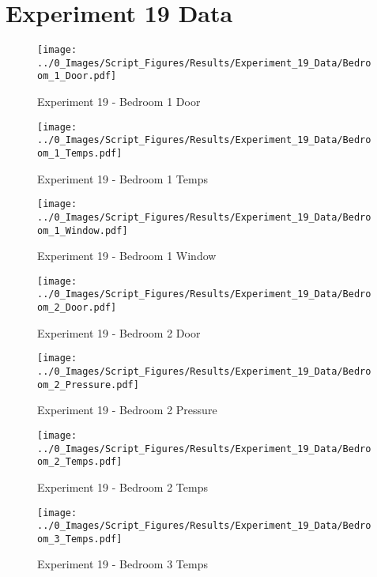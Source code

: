 \clearpage		\large
\section{Experiment 19 Data} \label{App:Exp19Results} 

	\begin{figure}[H]
		\centering
		\texttt{[image: ../0\_Images/Script\_Figures/Results/Experiment\_19\_Data/Bedroom\_1\_Door.pdf]}
		\caption[]{Experiment 19 - Bedroom 1 Door}
	\end{figure}
 

	\begin{figure}[H]
		\centering
		\texttt{[image: ../0\_Images/Script\_Figures/Results/Experiment\_19\_Data/Bedroom\_1\_Temps.pdf]}
		\caption[]{Experiment 19 - Bedroom 1 Temps}
	\end{figure}
 
	\clearpage

	\begin{figure}[H]
		\centering
		\texttt{[image: ../0\_Images/Script\_Figures/Results/Experiment\_19\_Data/Bedroom\_1\_Window.pdf]}
		\caption[]{Experiment 19 - Bedroom 1 Window}
	\end{figure}
 

	\begin{figure}[H]
		\centering
		\texttt{[image: ../0\_Images/Script\_Figures/Results/Experiment\_19\_Data/Bedroom\_2\_Door.pdf]}
		\caption[]{Experiment 19 - Bedroom 2 Door}
	\end{figure}
 
	\clearpage

	\begin{figure}[H]
		\centering
		\texttt{[image: ../0\_Images/Script\_Figures/Results/Experiment\_19\_Data/Bedroom\_2\_Pressure.pdf]}
		\caption[]{Experiment 19 - Bedroom 2 Pressure}
	\end{figure}
 

	\begin{figure}[H]
		\centering
		\texttt{[image: ../0\_Images/Script\_Figures/Results/Experiment\_19\_Data/Bedroom\_2\_Temps.pdf]}
		\caption[]{Experiment 19 - Bedroom 2 Temps}
	\end{figure}
 
	\clearpage

	\begin{figure}[H]
		\centering
		\texttt{[image: ../0\_Images/Script\_Figures/Results/Experiment\_19\_Data/Bedroom\_3\_Temps.pdf]}
		\caption[]{Experiment 19 - Bedroom 3 Temps}
	\end{figure}
 

